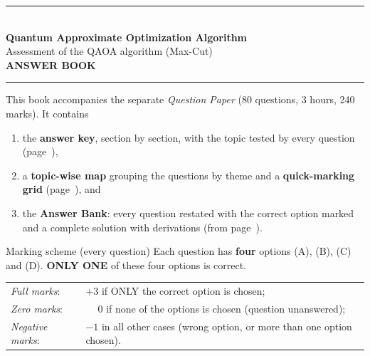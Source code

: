 \documentclass[11pt,a4paper]{article}
\begin{document}
\pagestyle{fancy}\fancyhf{}
\renewcommand{\headrulewidth}{0.4pt}

\thispagestyle{empty}
\begin{center}
{\color{brand}\rule{\linewidth}{1.2pt}}\\[6pt]
{\Huge\bfseries\color{brand} Quantum Approximate Optimization Algorithm}\\[4pt]
{\Large Assessment of the QAOA algorithm (Max-Cut)}\\[4pt]
{\large\bfseries ANSWER BOOK}\\[2pt]
{\color{brand}\rule{\linewidth}{1.2pt}}
\end{center}
This book accompanies the separate \emph{Question Paper} (80 questions, 3 hours, 240 marks). It contains
\begin{enumerate}[leftmargin=1.4em, itemsep=0pt, topsep=2pt]
\item the \textbf{answer key}, section by section, with the topic tested by every question (page~\pageref{key}),
\item a \textbf{topic-wise map} grouping the questions by theme and a \textbf{quick-marking grid} (page~\pageref{topicmap}), and
\item the \textbf{Answer Bank}: every question restated with the correct option marked \textcolor{okgreen}{} and a
      complete solution with derivations (from page~\pageref{bank}).
\end{enumerate}
\begin{infobox}{Marking scheme (every question)}
Each question has \textbf{four} options (A), (B), (C) and (D). \textbf{ONLY ONE} of these four options is correct.\\[2pt]
\begin{tabular}{@{}ll@{}}
\emph{Full marks}: & $+3$ if ONLY the correct option is chosen;\\
\emph{Zero marks}: & $\phantom{+}0$ if none of the options is chosen (question unanswered);\\
\emph{Negative marks}: & $-1$ in all other cases (wrong option, or more than one option chosen).
\end{tabular}
\end{infobox}
\end{document}
